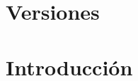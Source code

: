 \documentclass{article}
\author{%
	\textbf{Autor}\\    
    Daniel E. Hanke \\
    Trend Ingenieria \\
    \texttt{dehanke@proveedores.siderca.com}\vspace{20pt} \\
	\textbf{Supervisor}\\    
    Pablo Delfino \\
    GEIN / APRE \\
    \texttt{pdelfino@tenaris.com}
    }
\begin{document}


\tableofcontents

\newpage

\section{Versiones}


\newpage



\section{Introducción}
\end{document}
